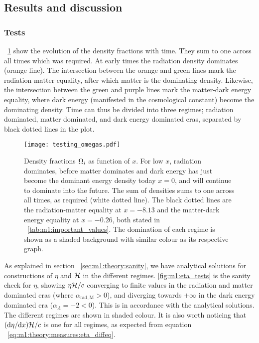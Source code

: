 \subsection{Results and discussion}\label{sec:m1:results}

\subsubsection{Tests}\label{sec:m1:results:tests}
    ~\cref{fig:m1:omega_tests} show the evolution of the density fractions with time. They sum to one across all times which was required. At early times the radiation density dominates (orange line). The intersection between the orange and green lines mark the radiation-matter equality, after which matter is the dominating density. Likewise, the intersection between the green and purple lines mark the matter-dark energy equality, where dark energy (manifested in the cosmological constant) become the dominating density. Time can thus be divided into three regimes; radiation dominated, matter dominated, and dark energy dominated eras, separated by black dotted lines in the plot. 
    \begin{figure}
        \texttt{[image: testing\_omegas.pdf]}
        \caption{Density fractions $\Omega_i$ as function of $x$. For low $x$, radiation dominates, before matter dominates and dark energy has just become the dominant energy density today $x=0$, and will continue to dominate into the future. The sum of densities sums to one across all times, as required (white dotted line). The black dotted lines are the radiation-matter equality at $x=-8.13$ and the matter-dark energy equality at $x=-0.26$, both stated in ~\cref{tab:m1:important_values}. The domination of each regime is shown as a shaded background with similar colour as its respective graph. }
        \label{fig:m1:omega_tests}
    \end{figure}
    
    As explained in section ~\cref{sec:m1:theory:sanity}, we have analytical solutions for constructions of $\eta$ and $\mathcal{H}$ in the different regimes. \cref{fig:m1:eta_tests} is the sanity check for $\eta$, showing $\eta\mathcal{H}/c$ converging to finite values in the radiation and matter dominated eras (where $\alpha_{\mathrm{rad}, \mathrm{M}}>0$), and diverging towards $+\infty$ in the dark energy dominated era ($\alpha_\Lambda =-2 <0$). This is in accordance with the analytical solutions. The different regimes are shown in shaded colour. It is also worth noticing that $(\mathrm{d} \eta /\mathrm{d} x)\mathcal{H}/c$ is one for all regimes, as expected from equation ~\cref{eq:m1:theory:measures:eta_diffeq}. 

